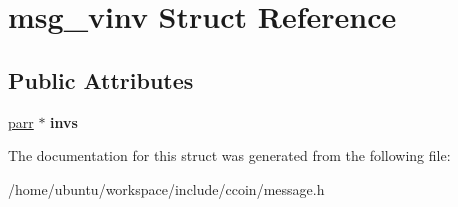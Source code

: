 \hypertarget{structmsg__vinv}{\section{msg\-\_\-vinv Struct Reference}
\label{structmsg__vinv}
}
\subsection*{Public Attributes}
\begin{DoxyCompactItemize}
\item 
\hypertarget{structmsg__vinv_a6648d3e92cecc80fa81cb0c17a6104ea}{\hyperlink{structparr}{parr} $\ast$ {\bfseries invs}}\label{structmsg__vinv_a6648d3e92cecc80fa81cb0c17a6104ea}

\end{DoxyCompactItemize}


The documentation for this struct was generated from the following file\-:\begin{DoxyCompactItemize}
\item 
/home/ubuntu/workspace/include/ccoin/message.\-h\end{DoxyCompactItemize}

